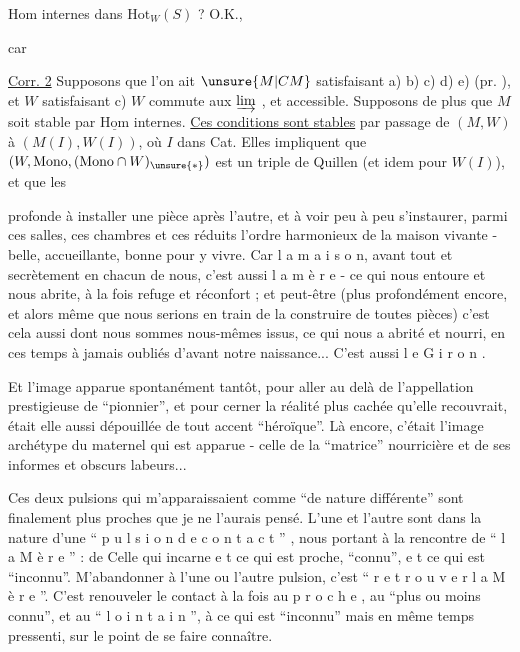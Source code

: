 $\mathrm{Hom}$ internes dans $\mathrm{Hot}_W(S)$ ? O.K.,

car 


\uline{Corr. 2} Supposons que l'on ait $\unsure{M|CM}$ satisfaisant  a) b) c) d) e)  (pr. ), et $W$ satisfaisant
c) $W$ commute aux $\varinjlim$ , et accessible. Supposons de plus que $M$ soit stable par $\underline{\mathrm{Hom}}$ internes.   \uline{Ces conditions sont stables} par passage de $(M,W)$ à $(M(I),W(I))$, où $I$ dans Cat. Elles impliquent que $(W,\mathrm{Mono},(\mathrm{Mono}\cap W)_{\unsure{*}})$ est un triple de Quillen  (et idem pour $W(I)$), et que les

profonde à installer une pièce après l'autre, et à voir peu à peu s'instaurer, parmi ces salles, ces chambres et ces réduits l'ordre harmonieux de la maison vivante - belle, accueillante, bonne pour y vivre. Car l a \quad m a i s o n, avant tout et secrètement en chacun de nous, c'est aussi l a \quad m è r e - ce qui nous entoure et nous abrite, à la fois refuge et réconfort ; et peut-être (plus profondément encore, et alors même que nous serions en train de la construire de toutes pièces) c'est cela aussi dont nous sommes nous-mêmes issus, ce qui nous a abrité et nourri, en ces temps à jamais oubliés d'avant notre naissance... C'est aussi l e \quad G i r o n .

Et l'image apparue spontanément tantôt, pour aller au delà de l'appellation prestigieuse de ``pionnier'', et pour cerner la réalité plus cachée qu'elle recouvrait, était elle aussi dépouillée de tout accent ``héroïque''. Là encore, c'était l'image archétype du maternel qui est apparue - celle de la ``matrice'' nourricière et de ses informes et obscurs labeurs...

Ces deux pulsions qui m'apparaissaient comme ``de nature différente'' sont finalement plus proches que je ne l'aurais pensé. L'une et l'autre sont dans la nature d'une `` p u l s i o n \quad d e \quad c o n t a c t '' , nous portant à la rencontre de `` l a \quad M è r e '' : de Celle qui incarne e t ce qui est proche, ``connu'', e t ce qui est ``inconnu''. M'abandonner à l'une ou l'autre pulsion, c'est `` r e t r o u v e r \quad l a \quad M è r e ''. C'est renouveler le contact à la fois au p r o c h e , au ``plus ou moins connu'', et au `` l o i n t a i n '', à ce qui est ``inconnu'' mais en même temps pressenti, sur le point de se faire connaître.

